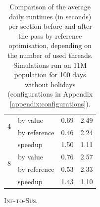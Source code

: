 \begin{table}[!ht]
\begin{subtable}[h]{0.45\textwidth}
\begin{tabular}{@{}clrr@{}}
            \multirow{2}{*}{4} & by value & 0.69 & 2.49 \\
             & by reference & 0.46 & 2.24 \\ \hdashline[1pt/1pt]
             & speedup & 1.50 & 1.11 \\ \midrule
            \multirow{2}{*}{8} & by value & 0.76 & 2.57 \\
             & by reference & 0.53 & 2.33 \\ \hdashline[1pt/1pt]
             & speedup & 1.43 & 1.10 \\ \bottomrule
        \end{tabular}
        \caption{\textsc{Inf-to-Sus}.}
        \label{tab:basis_standard_parallel_opt}
    \end{subtable}
    \caption{Comparison of the average daily runtimes (in seconds) per section before and after the pass by reference optimisation, depending on the number of used threads.  Simulations run on 11M population for 100 days without holidays (configurations in Appendix \ref{appendix:configurations}).}
    \label{tab:basis_standard_parallel}
\end{table}